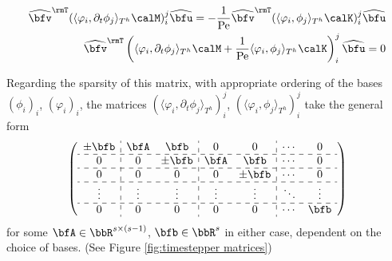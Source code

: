 \begin{example}
        \begin{align}
            \widehat{\bfv}^{\rmT}(\langle\varphi_{i}, \partial_{t}\phi_{j}\rangle_{T^{h}}\calM)^{j}_{i}\widehat{\bfu}  =  - \frac{1}{\rmPe}\widehat{\bfv}^{\rmT}(\langle\varphi_{i}, \phi_{j}\rangle_{T^{h}}\calK)^{j}_{i}\widehat{\bfu}  \\
            \widehat{\bfv}^{\rmT}\left(\langle\varphi_{i}, \partial_{t}\phi_{j}\rangle_{T^{h}}\calM + \frac{1}{\rmPe}\langle\varphi_{i}, \phi_{j}\rangle_{T^{h}}\calK\right)^{j}_{i}\widehat{\bfu}  =  0
        \end{align}
        
        Regarding the sparsity of this matrix, with appropriate ordering of the bases $(\phi_{i})_{i}$, $(\varphi_{i})_{i}$, the matrices $(\langle\varphi_{i}, \partial_{t}\phi_{j}\rangle_{T^{h}})^{j}_{i}$, $(\langle\varphi_{i}, \phi_{j}\rangle_{T^{h}})^{j}_{i}$ take the general form
        \begin{equation}\label{eqn:timestepper matrices}
            \left(\begin{array}{ c : c c : c c : c c }
                \pm\bfb  &  \bfA    &  \bfb     &  0       &  0        &  \cdots   &  0        \\
                \hdashline
                0        &  0       &  \pm\bfb  &  \bfA    &  \bfb     &  \cdots   &  0        \\
                \hdashline
                0        &  0       &  0        &  0       &  \pm\bfb  &  \cdots   &  0        \\
                \hdashline
                \vdots   &  \vdots  &  \vdots   &  \vdots  &  \vdots   &  \ddots   &  \vdots   \\
                \hdashline
                0        &  0       &  0        &  0       &  0        &  \cdots   &  \bfb     \\
            \end{array}\right)
        \end{equation}
        for some $\bfA  \in  \bbR^{s\times (s - 1)}$, $\bfb  \in  \bbR^{s}$ in either case, dependent on the choice of bases. (See Figure \ref{fig:timestepper matrices})
        

\end{example}
